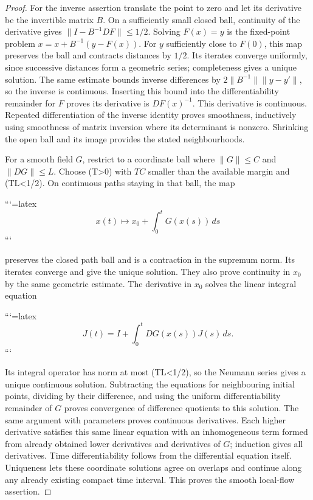\begin{proof}
For the inverse assertion translate the point to zero and let its derivative be the invertible matrix \(B\). On a sufficiently small closed ball, continuity of the derivative gives \(\|I-B^{-1}DF\|\leq1/2\). Solving \(F(x)=y\) is the fixed-point problem \(x=x+B^{-1}(y-F(x))\). For \(y\) sufficiently close to \(F(0)\), this map preserves the ball and contracts distances by \(1/2\). Its iterates converge uniformly, since successive distances form a geometric series; completeness gives a unique solution. The same estimate bounds inverse differences by \(2\|B^{-1}\|\|y-y'\|\), so the inverse is continuous. Inserting this bound into the differentiability remainder for \(F\) proves its derivative is \(DF(x)^{-1}\). This derivative is continuous. Repeated differentiation of the inverse identity proves smoothness, inductively using smoothness of matrix inversion where its determinant is nonzero. Shrinking the open ball and its image provides the stated neighbourhoods.

For a smooth field \(G\), restrict to a coordinate ball where \(\|G\|\leq C\) and \(\|DG\|\leq L\). Choose (T>0) with \(TC\) smaller than the available margin and (TL<1/2). On continuous paths staying in that ball, the map


```{=latex}
\[
x(t)\longmapsto x_0+\int_0^tG(x(s))\,ds
\]
```


preserves the closed path ball and is a contraction in the supremum norm. Its iterates converge and give the unique solution. They also prove continuity in \(x_0\) by the same geometric estimate. The derivative in \(x_0\) solves the linear integral equation


```{=latex}
\[
J(t)=I+\int_0^t DG(x(s))J(s)\,ds.
\]
```


Its integral operator has norm at most (TL<1/2), so the Neumann series gives a unique continuous solution. Subtracting the equations for neighbouring initial points, dividing by their difference, and using the uniform differentiability remainder of \(G\) proves convergence of difference quotients to this solution. The same argument with parameters proves continuous derivatives. Each higher derivative satisfies this same linear equation with an inhomogeneous term formed from already obtained lower derivatives and derivatives of \(G\); induction gives all derivatives. Time differentiability follows from the differential equation itself. Uniqueness lets these coordinate solutions agree on overlaps and continue along any already existing compact time interval. This proves the smooth local-flow assertion.
\end{proof}

